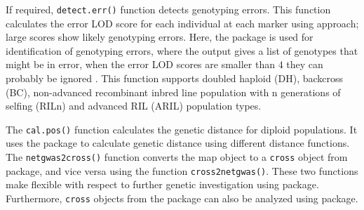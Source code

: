 If required, {\tt detect.err()} function detects genotyping errors. This function calculates the error LOD score for each individual at each marker using \cite{lincoln1992systematic} approach; large scores show likely genotyping errors. Here, the  package \citep{broman2003r} is used for identification of genotyping errors, where the output gives a list of genotypes that might be in error, when the error LOD scores are smaller than $4$ they can probably be ignored \citep{broman2009brief}. This function supports doubled haploid (DH), backcross (BC), non-advanced recombinant inbred line population with n generations of selfing (RILn) and advanced RIL (ARIL) population types.  %

The {\tt cal.pos()} function calculates the genetic distance for diploid populations. It uses the  package to calculate genetic distance using different distance functions. %
The {\tt netgwas2cross()} function converts the map object to a {\tt cross} object from  package, and vice versa using the function {\tt cross2netgwas()}. These two functions make  flexible with respect to further genetic investigation using  package. Furthermore, {\tt cross} objects from the  package can also be analyzed using  package.


